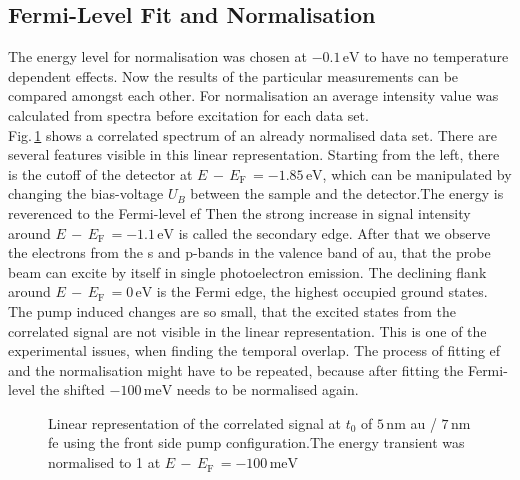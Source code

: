 \documentclass[a4paper,12pt,twoside]{article}
\begin{document}
\newpage
        \subsection{Fermi-Level Fit and Normalisation}
            \label{chapNFLF}
The energy level for normalisation was chosen at $-0.1\,\mathrm{\mbox{eV}}$ to have no temperature dependent effects. Now the results of the particular measurements can be compared amongst each other. For normalisation an average intensity value was calculated from spectra before excitation for each data set.\\
Fig.\,\ref{norm} shows a correlated spectrum of an already normalised data set. There are several features visible in this linear representation. Starting from the left, there is the cutoff of the detector at $E\,-\,E_\mathrm{F}\,= -1.85\,\mathrm{\mbox{eV}}$, which can be manipulated by changing the bias-voltage $U_B$ between the sample and the detector.The energy is reverenced to the Fermi-level \gls{ef} Then the strong increase in signal intensity around $E\,-\,E_\mathrm{F}\,= -1.1\,\mathrm{\mbox{eV}}$ is called the secondary edge. After that we observe the electrons from the s and p-bands in the valence band of \gls{au}, that the probe beam can excite by itself in single photoelectron emission. The declining flank around $E\,-\,E_\mathrm{F}\,= 0\,\mathrm{\mbox{eV}}$ is the Fermi edge, the highest occupied ground states. The pump induced changes are so small, that the excited states from the correlated signal are not visible in the linear representation. This is one of the experimental issues, when finding the temporal overlap. The process of fitting \gls{ef} and the normalisation might have to be repeated, because after fitting the Fermi-level the shifted $-100\,\mathrm{meV}$ needs to be normalised again.
	\begin{figure}[H]
		\caption{Linear representation of the  correlated signal at $t_0$ of $5\,\mathrm{{nm}}$ \gls{au} / $7\,\mathrm{{nm}}$ \gls{fe} using the front side pump configuration.The energy transient was normalised to 1 at $E\,-\,E_\mathrm{F}\,= -100\,\mathrm{meV}$}
	    	\label{norm}
	\end{figure}
\end{document}

